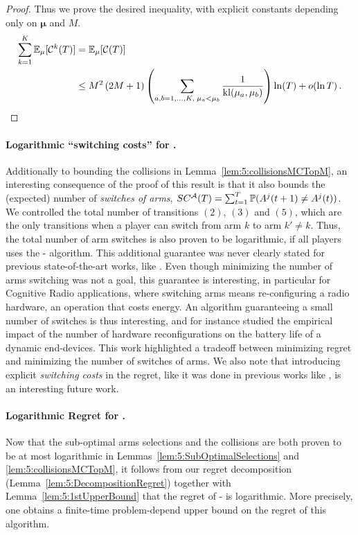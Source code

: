 \begin{proof}
  Thus we prove the desired inequality, with explicit constants depending only on $\boldsymbol{\mu}$ and $M$.
  \begin{align}
    \sum_{k=1}^K \mathbb{E}_{\mu}[\mathcal{C}^k(T)] & = \mathbb{E}_{\mu}[\mathcal{C}(T)] \nonumber\\
    & \leq M^2\left(2 M + 1\right) \left(\sum_{a,b=1,\dots,K,\;\mu_a < \mu_b} \frac{1}{\mathrm{kl}(\mu_a,\mu_b)}\right) \ln(T) + \mathop{}\mathopen{}o\mathopen{}\left(\ln T\right).
  \end{align}
\end{proof}


\paragraph{Logarithmic ``switching costs'' for \MCTopM.}\label{app:5:NumberSwitches}
%
Additionally to bounding the collisions in Lemma~\ref{lem:5:collisionsMCTopM},
an interesting consequence of the proof of this result is that
it also bounds the (expected) number of \emph{switches of arms}, $SC^{\mathcal{A}}(T) = \sum_{t=1}^T \mathbb{P}(A^j(t+1) \neq A^j(t))$.
%
We controlled the total number of transitions $(2)$, $(3)$ and $(5)$,
which are the only transitions when a player can switch from arm $k$ to arm $k'\neq k$.
Thus, the total number of arm switches is also proven to be logarithmic, if all players uses the \MCTopM-\klUCB{} algorithm.
This additional guarantee was never clearly stated for previous state-of-the-art works, like \rhoRand.
%
Even though minimizing the number of arms switching was not a goal,
this guarantee is interesting, in particular for Cognitive Radio applications,
where switching arms means re-configuring a radio hardware, an operation that costs energy.
An algorithm guaranteeing a small number of switches is thus interesting,
and for instance \cite{modiDemo2016} studied the empirical impact of the number of hardware reconfigurations on the battery life of a dynamic end-devices.
This work highlighted a tradeoff between minimizing regret and minimizing the number of switches of arms.
%
We also note that introducing explicit \emph{switching costs} in the regret, like it was done in previous works like \cite{Koren17}, is an interesting future work.


\paragraph{Logarithmic Regret for \MCTopM.}
%
Now that the sub-optimal arms selections and the collisions
are both proven to be at most logarithmic in Lemmas~\ref{lem:5:SubOptimalSelections} and \ref{lem:5:collisionsMCTopM},
it follows from our regret decomposition (Lemma~\ref{lem:5:DecompositionRegret}) together with Lemma~\ref{lem:5:1stUpperBound} that the regret of \MCTopM-\klUCB{} is logarithmic. More precisely, one obtains a finite-time problem-depend upper bound on the regret of this algorithm.

